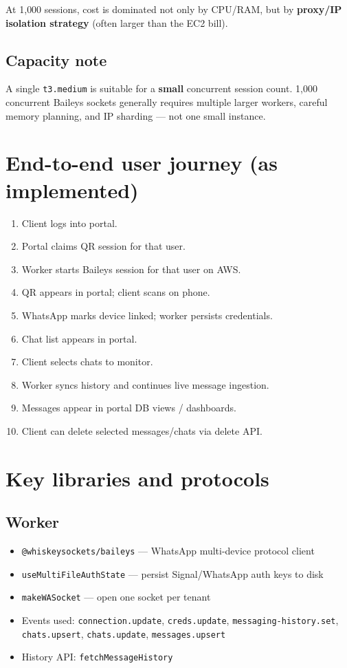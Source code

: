 \documentclass[11pt,a4paper]{article}
\begin{document}
\vspace{8pt}
At 1{,}000 sessions, cost is dominated not only by CPU/RAM, but by \textbf{proxy/IP isolation strategy} (often larger than the EC2 bill).

\subsection{Capacity note}

A single \texttt{t3.medium} is suitable for a \textbf{small} concurrent session count. 1{,}000 concurrent Baileys sockets generally requires multiple larger workers, careful memory planning, and IP sharding --- not one small instance.

\section{End-to-end user journey (as implemented)}

\begin{enumerate}[leftmargin=1.4em]
  \item Client logs into portal.
  \item Portal claims QR session for that user.
  \item Worker starts Baileys session for that user on AWS.
  \item QR appears in portal; client scans on phone.
  \item WhatsApp marks device linked; worker persists credentials.
  \item Chat list appears in portal.
  \item Client selects chats to monitor.
  \item Worker syncs history and continues live message ingestion.
  \item Messages appear in portal DB views / dashboards.
  \item Client can delete selected messages/chats via delete API.
\end{enumerate}

\section{Key libraries and protocols}

\subsection{Worker}

\begin{itemize}[leftmargin=1.2em]
  \item \texttt{@whiskeysockets/baileys} --- WhatsApp multi-device protocol client
  \item \texttt{useMultiFileAuthState} --- persist Signal/WhatsApp auth keys to disk
  \item \texttt{makeWASocket} --- open one socket per tenant
  \item Events used: \texttt{connection.update}, \texttt{creds.update}, \texttt{messaging-history.set}, \texttt{chats.upsert}, \texttt{chats.update}, \texttt{messages.upsert}
  \item History API: \texttt{fetchMessageHistory}
\end{itemize}
\end{document}
